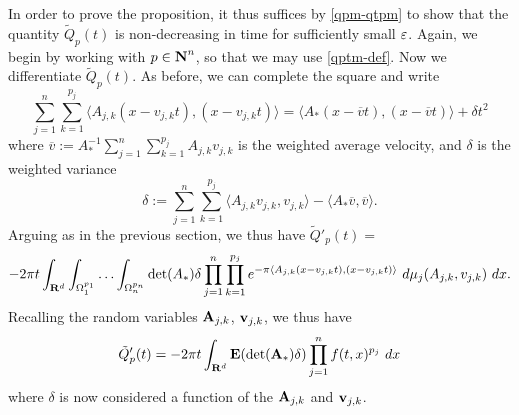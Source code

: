 In order to prove the proposition, it thus suffices by
\eqref{qpm-qtpm} to show that the quantity $\tilde Q_p(t)$ is
non-decreasing in time for sufficiently small $\varepsilon$.
Again, we begin by working with
$p\in{\hbox{\bf N}}^n$, so that we may use \eqref{qptm-def}. Now we
differentiate $\tilde Q_p(t)$.  As before, we can complete the square and
write
$$ \sum_{j=1}^n \sum_{k=1}^{p_j}
\langle A_{j,k}(x-v_{j,k} t), (x-v_{j,k} t) \rangle = \langle
A_*(x - \overline{v} t), (x-\overline{v} t) \rangle + \delta t^2$$
where $\overline{v} := A_*^{-1} \sum_{j=1}^n \sum_{k=1}^{p_j}
A_{j,k} v_{j,k}$ is the weighted average velocity, and $\delta$ is the weighted variance
\begin{equation}\label{delta}
 \delta := \sum_{j=1}^n \sum_{k=1}^{p_j} \langle A_{j,k} v_{j,k}, v_{j,k} \rangle -
\langle A_* \overline{v}, \overline{v} \rangle.
\end{equation}
Arguing as in the previous section, we thus have
$\tilde Q'_p(t) =$
$$-2\pi t \int_{{\bf R}^d} \int_{\Omega_1^{p_1}} \ldots \int_{\Omega_n^{p_n}}
\det(A_*) \delta \prod_{j=1}^n \prod_{k=1}^{p_j} e^{-\pi \langle
A_{j,k}(x-v_{j,k} t), (x-v_{j,k} t) \rangle}\ d\mu_j(A_{j,k},
v_{j,k})\ dx.$$ Recalling the random variables
${\hbox{\bf A}}_{j,k}$, ${\hbox{\bf v}}_{j,k}$, we thus have
\begin{equation}\label{tqpm-deriv}
 \tilde Q'_p(t) = -2\pi t \int_{{\bf R}^d} {\hbox{\bf E}}(\det({\hbox{\bf A}}_*) \delta) \prod_{j=1}^n f(t,x)^{p_j}\ dx
\end{equation}
where $\delta$ is now considered a function of the ${\hbox{\bf A}}_{j,k}$ and
${\hbox{\bf v}}_{j,k}$.

